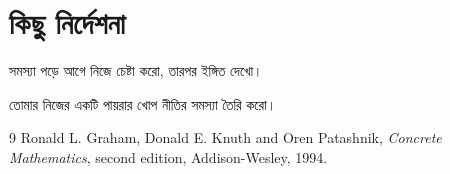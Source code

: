\documentclass[12pt,twoside]{bookbangla}
\begin{document}
\appendix
\chapter{কিছু নির্দেশনা}
সমস্যা পড়ে আগে নিজে চেষ্টা করো, তারপর ইঙ্গিত দেখো।
\begin{exercise}\label{exercise:appendix}
তোমার নিজের একটি পায়রার খোপ নীতির সমস্যা তৈরি করো।
\end{exercise}
\backmatter
\begin{thebibliography}{9}
 Ronald L. Graham, Donald E. Knuth and Oren Patashnik,
\emph{Concrete Mathematics}, second edition, Addison-Wesley, 1994.
\end{thebibliography}
\end{document}
